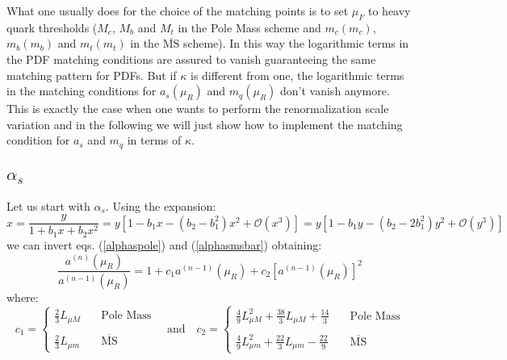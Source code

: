 \documentclass[10pt,a4paper]{article}
\begin{document}
What one usually does for the choice of the matching points is to set $\mu_F$ to heavy quark thresholds ($M_c$, $M_b$ and $M_t$ in the Pole Mass scheme and $m_c(m_c)$, $m_b(m_b)$ and $m_t(m_t)$ in the $\overline{\mbox{MS}}$ scheme). In this way the logarithmic terms in the PDF matching conditions are assured to vanish guaranteeing the same matching pattern for PDFs. But if $\kappa$ is different from one, the logarithmic terms in the matching conditions for $a_s(\mu_R)$ and $m_q(\mu_R)$ don't vanish anymore. This is exactly the case when one wants to perform the renormalization scale variation and in the following we will just show how to implement the matching condition for $a_s$ and $m_q$ in terms of $\kappa$.

\subsection{$\alpha_s$}
Let us start with $\alpha_s$. Using the expansion:
\begin{equation}
x=\frac{y}{1+b_1x+b_2x^2} = y\left[1-b_1x-(b_2-b_1^2)x^2 + \mathcal{O}(x^3)\right] = y \left[1-b_1y-(b_2-2b_1^2)y^2 + \mathcal{O}(y^3)\right]
\end{equation}
we can invert eqs. (\ref{alphaspole}) and (\ref{alphasmsbar}) obtaining:
\begin{equation}
\frac{a^{(n)}(\mu_R)}{a^{(n-1)}(\mu_R)} = 1 + c_1a^{(n-1)}(\mu_R) + c_2 [a^{(n-1)}(\mu_R)]^2
\end{equation}
where:
\begin{equation}
c_1 = \left\{
\begin{array}{ll}
\displaystyle \frac23 L_{\mu M}&\quad\mbox{Pole Mass}\\
\\
\displaystyle \frac23 L_{\mu m}&\quad\overline{\mbox{MS}}
\end{array}\right.\quad\mbox{and}\quad
c_2 = \left\{
\begin{array}{ll}
\displaystyle \frac49L_{\mu M}^2+\frac{38}3L_{\mu M}+\frac{14}3 &\quad\mbox{Pole Mass}\\
\\
\displaystyle \frac49L_{\mu m}^2+\frac{22}3L_{\mu m}-\frac{22}9&\quad\overline{\mbox{MS}}
\end{array}\right.
\end{equation}
\end{document}
